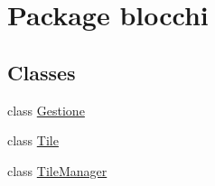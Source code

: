 \hypertarget{namespaceblocchi}{}\section{Package blocchi}
\label{namespaceblocchi}
\subsection*{Classes}
\begin{DoxyCompactItemize}
\item 
class \hyperlink{classblocchi_1_1_gestione}{Gestione}
\item 
class \hyperlink{classblocchi_1_1_tile}{Tile}
\item 
class \hyperlink{classblocchi_1_1_tile_manager}{Tile\+Manager}
\end{DoxyCompactItemize}
